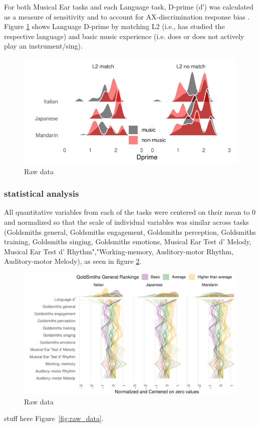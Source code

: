 \documentclass[a4paper]{article}
\begin{document}
For both Musical Ear tasks and each Language task,  D-prime (d′) was calculated as a measure of sensitivity and to account for AX-discrimination response bias \cite{Macmillan_Creelman_2004}. Figure \ref{fig:dprime} shows Language D-prime by matching L2 (i.e., has studied the respective language) and basic music experience (i.e. does or does not actively play an instrument/sing). 

\begin{figure}[t]
  \centering
  \includegraphics[width=\linewidth]{SP_24_visuals/dprime_density_across_tasks.pdf}
  \caption{Raw data}
  \label{fig:dprime}
\end{figure}

\subsubsection{statistical analysis}


All quantitative variables from each of the tasks were centered on their mean to 0 and normalized so that the scale of individual variables was similar across tasks (Goldsmiths general, Goldsmiths engagement, Goldsmiths perception, Goldsmiths training, Goldsmiths singing, Goldsmiths emotions, Musical Ear Test d' Melody, Musical Ear Test d' Rhythm","Working-memory, Auditory-motor Rhythm, Auditory-motor Melody), as seen in figure \ref{fig:centered_data}.

\begin{figure}[t]
  \centering
  \includegraphics[width=\textwidth]{SP_24_visuals/by_gs.pdf}
  \caption{Raw data}
  \label{fig:centered_data}
\end{figure}
stuff here Figure~\ref{fig:raw_data}.
\end{document}
